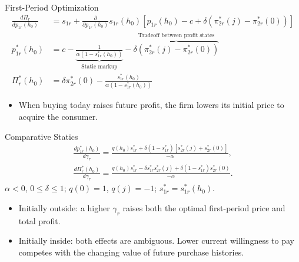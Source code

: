 \documentclass[aspectratio=169,professionalfonts]{beamer}
\newcommand{\shortbuttons}{}
\begin{document}
\gdef\shortbuttons{\hyperlink{short-9}{\beamergotobutton{Terminal FOC}}\hspace{.35em}\hyperlink{short-11}{\beamergotobutton{Comparative statics}}\hspace{.35em}\hyperlink{short-52}{\beamergotobutton{Elasticities}}}
\begin{frame}[label=short-10]{First-Period Optimization}
  \begin{align*}
    \frac{d\Pi_r}{d p_{1r}(h_0)} &= s_{1r} + \frac{\partial}{\partial p_{1r}(h_0)}s_{1r}(h_0)[p_{1r}(h_0) - c + \delta(\pi_{2r}^*(j) - \pi_{2r}^*(0))] \\
    p_{1r}^*(h_0) &= c - \underbrace{\frac{1}{\alpha(1-s_{1r}^*(h_0))}}_{\text{Static markup}} - \overbrace{\delta(\pi_{2r}^*(j) - \pi_{2r}^*(0))}^{\text{Tradeoff between profit states}} \\
    \Pi_r^*(h_0) &= \delta\pi_{2r}^*(0) - \frac{s_{1r}^*(h_0)}{\alpha(1-s_{1r}^*(h_0))}
  \end{align*}
  \begin{itemize}
    \item When buying today raises future profit, the firm lowers its initial price to acquire the consumer.
  \end{itemize}
\end{frame}

\gdef\shortbuttons{}
\begin{frame}[label=short-comp-stat]{Comparative Statics}
  \begin{gather*}
    \frac{d p_{1r}^*(h_0)}{d\gamma_r}
      = \frac{q(h_0)s_{1r}^*+\delta(1-s_{1r}^*)[s_{2r}^*(j)+s_{2r}^*(0)]}{-\alpha},\\[6pt]
    \frac{d\Pi_r^*(h_0)}{d\gamma_r}
      = \frac{q(h_0)s_{1r}^*-\delta s_{1r}^*s_{2r}^*(j)
              +\delta(1-s_{1r}^*)s_{2r}^*(0)}{-\alpha}.
  \end{gather*}
  {\small $\alpha<0$, $0\leq\delta\leq1$;
  $q(0)=1$, $q(j)=-1$; $s_{1r}^*=s_{1r}^*(h_0)$.}
  \medskip
  \begin{itemize}
    \item Initially outside: a higher $\gamma_r$ raises both the optimal first-period
      price and total profit.
    \item Initially inside: both effects are ambiguous. Lower current willingness
      to pay competes with the changing value of future purchase histories.
  \end{itemize}
\end{frame}
\end{document}
